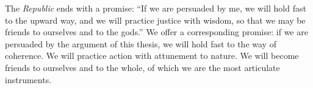 The \emph{Republic} ends with a promise: ``If we are persuaded by me, we will
hold fast to the upward way, and we will practice justice with wisdom, so that
we may be friends to ourselves and to the gods.'' We offer a corresponding
promise: if we are persuaded by the argument of this thesis, we will hold fast
to the way of coherence. We will practice action with attunement to nature. We
will become friends to ourselves and to the whole, of which we are the most
articulate instruments.
